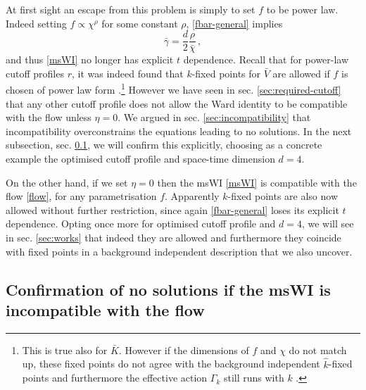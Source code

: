 \documentclass[11pt]{book} %
\newcommand{\bc}{\bar \chi}
\newcommand{\bV}{\bar V}
\newcommand{\bg}{\bar \gamma}
\newcommand{\be}{\begin{equation}}
\newcommand{\ee}{\end{equation}}
\begin{document}
At first sight an escape from this problem is simply to set $f$ to be power law.
Indeed setting $f\propto\chi^{\rho}$ for some constant $\rho$, \eqref{fbar-general} implies
\be
\bg = \frac{d}{2} \frac{\rho}{\bc}\,,
\label{powlaw-gamma}
\ee
and thus \eqref{msWI} no longer has explicit $t$ dependence.
Recall that for power-law cutoff profiles $r$, it was indeed found that $k$-fixed points for $\bV$
are allowed if $f$ is chosen of power law form \cite{Dietz:2015owa}.\footnote{This is true also for $\bar{K}$. However if the dimensions of $f$ and $\chi$ do not match up, these fixed points do not agree with
the background independent $\hat{k}$-fixed points and furthermore the effective action
$\Gamma_k$ still runs with $k$ \cite{Dietz:2015owa}.}
However we have seen in sec. \ref{sec:required-cutoff} that any other cutoff profile does
not allow the Ward identity to be compatible with the flow unless $\eta=0$.
We argued in sec. \ref{sec:incompatibility} that incompatibility overconstrains the equations
leading to no solutions. In the next subsection, sec. \ref{sec:incompatible-no-solns},
we will confirm this explicitly, choosing as a concrete example the optimised cutoff profile and
space-time dimension $d=4$.

On the other hand, if we set $\eta=0$ then the msWI \eqref{msWI} is compatible with the flow \eqref{flow},
for any parametrisation $f$. Apparently $k$-fixed points are also now allowed without further restriction,
since again \eqref{fbar-general} loses its explicit $t$ dependence.
Opting once more for optimised cutoff profile and $d=4$, we will see in sec. \ref{sec:works} that
indeed they are allowed and furthermore they coincide with fixed points in a background independent
description that we also uncover.


\subsection{Confirmation of no solutions if the msWI is incompatible with the flow}
\label{sec:incompatible-no-solns}
\end{document}
